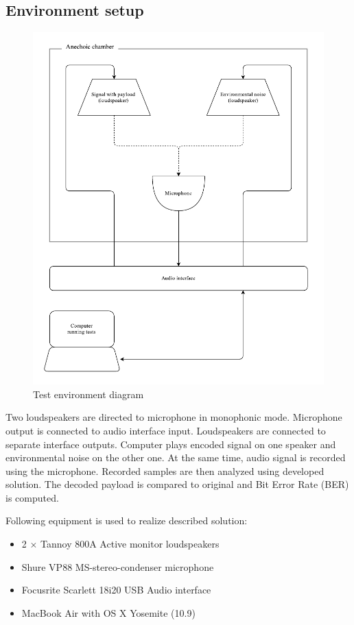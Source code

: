 \documentclass[english,bachelor,a4paper,oneside]{ppfcmthesis}
\begin{document}
\subsection{Environment setup}
\begin{figure}[h]
  \includegraphics[width=\linewidth]{figures/experiments/environment}
  \caption{Test environment diagram}
  \label{fig:test-environment}
\end{figure}
Two loudspeakers are directed to microphone in monophonic mode. Microphone output is connected to audio interface input. Loudspeakers are connected to separate
interface outputs. Computer plays encoded signal on one speaker and environmental noise on the other one. At the same time, audio signal is
recorded using the microphone. Recorded samples are then analyzed using developed solution. The decoded payload is compared to original and Bit Error Rate (BER) is computed.

\clearpage

Following equipment is used to realize described solution:
\begin{itemize}
\item 2 $\times$ Tannoy 800A Active monitor loudspeakers
\item Shure VP88 MS-stereo-condenser microphone
\item Focusrite Scarlett 18i20 USB Audio interface
\item MacBook Air with OS X Yosemite (10.9)
\end{itemize}
\end{document}
